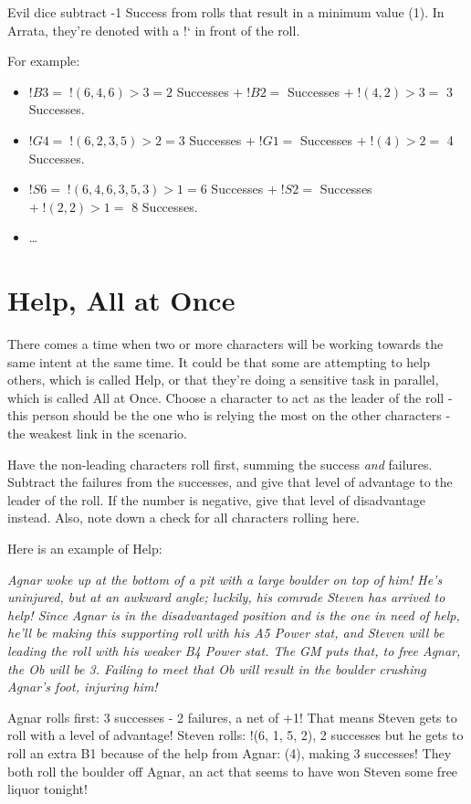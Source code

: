 \documentclass[../main.tex]{subfiles}
\begin{document}
        Evil dice subtract -1 Success from rolls that result in a minimum value (1). In Arrata, they're denoted with a !` in front of the roll.

    For example:
    \begin{itemize}
        \item $!B3 =\; !(6, 4, 6)>3 = 2$\; Successes $+\; !B2 = $ Successes $ +\; !(4, 2)>3 = $ 3 Successes.
        \item $!G4 =\; !(6, 2, 3, 5)>2 = 3$\; Successes $+\; !G1 = $ Successes $+\; !(4)>2 = $ 4 Successes.
        \item $!S6 =\; !(6, 4, 6, 3, 5, 3)>1 = 6$\; Successes $+\; !S2 = $ Successes $+\; !(2, 2)>1 = $ 8 Successes.
        \item \dots
    \end{itemize}

    \section{Help, All at Once}

        There comes a time when two or more characters will be working towards the same intent at the same time. It could be that some are attempting to help others, which is called Help, or that they're doing a sensitive task in parallel, which is called All at Once. Choose a character to act as the leader of the roll - this person should be the one who is relying the most on the other characters - the weakest link in the scenario.

        Have the non-leading characters roll first, summing the success {\em and} failures. Subtract the failures from the successes, and give that level of advantage to the leader of the roll. If the number is negative, give that level of disadvantage instead. Also, note down a check for all characters rolling here.

        Here is an example of Help:

        \begin{displayquote}
            {\em Agnar woke up at the bottom of a pit with a large boulder on top of him! He's uninjured, but at an awkward angle; luckily, his comrade Steven has arrived to help! Since Agnar is in the disadvantaged position and is the one in need of help, he'll be making this supporting roll with his A5 Power stat, and Steven will be leading the roll with his weaker B4 Power stat. The GM puts that, to free Agnar, the Ob will be 3. Failing to meet that Ob will result in the boulder crushing Agnar's foot, injuring him!

            Agnar rolls first: 3 successes - 2 failures, a net of +1! That means Steven gets to roll with a level of advantage! Steven rolls: !(6, 1, 5, 2), 2 successes but he gets to roll an extra B1 because of the help from Agnar: (4), making 3 successes! They both roll the boulder off Agnar, an act that seems to have won Steven some free liquor tonight!}
        \end{displayquote}
\end{document}
